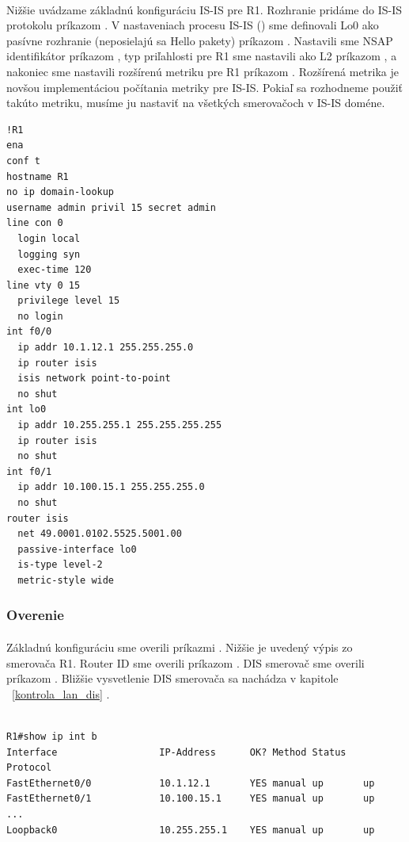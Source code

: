 \documentclass[12pt,twoside,a4paper]{report}
\begin{document}
\paragraph{}
Nižšie uvádzame základnú konfiguráciu IS-IS pre R1. Rozhranie pridáme do IS-IS protokolu príkazom . V nastaveniach procesu IS-IS () sme definovali Lo0 ako pasívne rozhranie (neposielajú sa Hello pakety) príkazom . Nastavili sme NSAP identifikátor príkazom , typ priľahlosti pre R1 sme nastavili ako L2 príkazom , a nakoniec sme nastavili rozšírenú metriku pre R1 príkazom . Rozšírená metrika je novšou implementáciou počítania metriky pre IS-IS. Pokiaľ sa rozhodneme použiť takúto metriku, musíme ju nastaviť na všetkých smerovačoch v IS-IS doméne.

\noindent
{\selectfont
\begin{small}
\begin{verbatim}
!R1
ena
conf t
hostname R1
no ip domain-lookup
username admin privil 15 secret admin
line con 0
  login local
  logging syn
  exec-time 120
line vty 0 15
  privilege level 15
  no login
int f0/0
  ip addr 10.1.12.1 255.255.255.0
  ip router isis
  isis network point-to-point
  no shut
int lo0
  ip addr 10.255.255.1 255.255.255.255
  ip router isis
  no shut
int f0/1
  ip addr 10.100.15.1 255.255.255.0
  no shut
router isis
  net 49.0001.0102.5525.5001.00
  passive-interface lo0
  is-type level-2
  metric-style wide
\end{verbatim}
\end{small}
}

\subsubsection{Overenie}
\paragraph{}
Základnú konfiguráciu sme overili príkazmi . Nižšie je uvedený výpis zo smerovača R1. Router ID sme overili príkazom . DIS smerovač sme overili príkazom . Bližšie vysvetlenie DIS smerovača sa nachádza v kapitole ~\ref{kontrola_lan_dis} .

\noindent
{\selectfont
\begin{small}
\begin{verbatim}

R1#show ip int b
Interface                  IP-Address      OK? Method Status   Protocol
FastEthernet0/0            10.1.12.1       YES manual up       up      
FastEthernet0/1            10.100.15.1     YES manual up       up      
...    
Loopback0                  10.255.255.1    YES manual up       up  

\end{verbatim}
\end{small}
}
\end{document}
